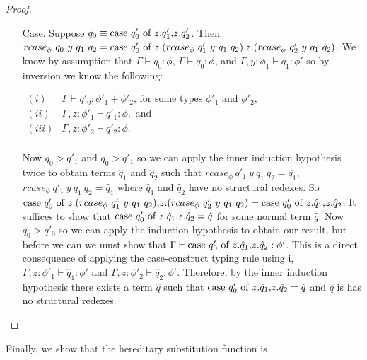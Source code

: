 \begin{proof}
\begin{itemize}
\begin{itemize}
\begin{itemize}
    \item[Case.] Suppose $q_0 \equiv \mbox{case}\ q'_0\ \text{of}\ z\text{.}q'_1\text{,}z\text{.}q'_2$.  Then \\
      $rcase_{\phi}\ q_0\ y\ q_1\ q_2 = \ccon{q'_0}{z}{(rcase_{\phi}\ q'_1\ y\ q_1\ q_2)}{(rcase_{\phi}\ q'_2\ y\ q_1\ q_2)}$.
      We know by assumption that $\Gamma \vdash q_0:\phi$, $\Gamma \vdash q_0:\phi$, and $\Gamma, y:\phi_1 \vdash q_1:\phi'$
      so by inversion we know the following:
      \begin{center}
        \begin{math}
          \begin{array}{lll}
            (i) & \Gamma \vdash q'_0:\phi'_1 + \phi'_2 \text{, for some types } \phi'_1 \text{ and } \phi'_2,\\
            (ii) & \Gamma, z:\phi'_1 \vdash q'_1:\phi, \text{ and }\\
            (iii) & \Gamma, z:\phi'_2 \vdash q'_2:\phi.\\
          \end{array}
        \end{math}
      \end{center}
      Now $q_0 > q'_1$ and $q_0 > q'_1$ so we can apply the inner induction hypothesis twice to obtain terms $\hat{q}_1$ and
      $\hat{q}_2$ such that $rcase_{\phi}\ q'_1\ y\ q_1\ q_2 = \hat{q}_1$, $rcase_{\phi}\ q'_1\ y\ q_1\ q_2 = \hat{q}_1$ where 
      $\hat{q}_1$ and $\hat{q}_2$ have no structural redexes. So
      $\ccon{q'_0}{z}{(rcase_{\phi}\ q'_1\ y\ q_1\ q_2)}{(rcase_{\phi}\ q'_2\ y\ q_1\ q_2)} = 
      \ccon{q'_0}{z}{\hat{q}_1}{\hat{q}_2}$.  It suffices to show that $\mbox{case}\ q'_0\ \text{of}\ z\text{.}\hat{q}_1\text{,}z\text{.}\hat{q}_2 = \hat{q}$ 
      for some normal term $\hat{q}$.  Now $q_0 > q'_0$ so we can apply the induction hypothesis
      to obtain our result, but before we can we must show that $\Gamma \vdash \mbox{case}\ q'_0\ \text{of}\ z\text{.}\hat{q}_1\text{,}z\text{.}\hat{q}_2:\phi'$.
      This is a direct consequence of applying the case-construct typing rule using i, $\Gamma, z:\phi'_1 \vdash \hat{q}_1:\phi'$
      and $\Gamma, z:\phi'_2 \vdash \hat{q}_2:\phi'$.  Therefore, by the inner induction hypothesis there exists a term $\hat{q}$ 
      such that $\mbox{case}\ q'_0\ \text{of}\ z\text{.}\hat{q}_1\text{,}z\text{.}\hat{q}_2 = \hat{q}$ and $\hat{q}$ is has no structural redexes.
    \end{itemize}
  \end{itemize}
\end{itemize}
\end{proof}
\noindent
Finally, we show that the hereditary substitution function is
